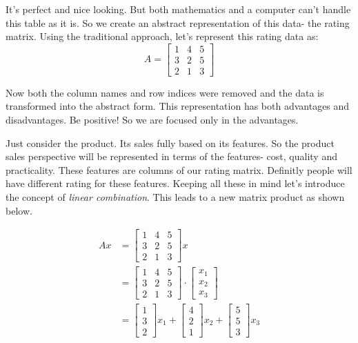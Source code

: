 \documentclass[
  letterpaper,
  DIV=11,
  numbers=noendperiod]{scrreprt}
\theoremstyle{plain}
\theoremstyle{definition}
\theoremstyle{remark}
\begin{document}
It's perfect and nice looking. But both mathematics and a computer can't
handle this table as it is. So we create an abstract representation of
this data- the rating matrix. Using the traditional approach, let's
represent this rating data as:
\[A=\begin{bmatrix}1&4&5\\3&2&5\\2&1&3\end{bmatrix}\]

Now both the column names and row indices were removed and the data is
transformed into the abstract form. This representation has both
advantages and disadvantages. Be positive! So we are focused only in the
advantages.

Just consider the product. Its sales fully based on its features. So the
product sales perspective will be represented in terms of the features-
cost, quality and practicality. These features are columns of our rating
matrix. Definitly people will have different rating for these features.
Keeping all these in mind let's introduce the concept of \emph{linear
combination}. This leads to a new matrix product as shown below.

\begin{align*}
Ax&=\begin{bmatrix}
1&4&5\\
3&2&5\\
2&1&3
\end{bmatrix}x\\
&=\begin{bmatrix}
1&4&5\\
3&2&5\\
2&1&3
\end{bmatrix}\cdot\begin{bmatrix}x_1\\x_2\\x_3\end{bmatrix}\\
&=\begin{bmatrix}1\\3\\2\end{bmatrix}x_1+\begin{bmatrix}4\\2\\1\end{bmatrix}x_2+\begin{bmatrix}5\\5\\3\end{bmatrix}x_3
\end{align*}
\end{document}
